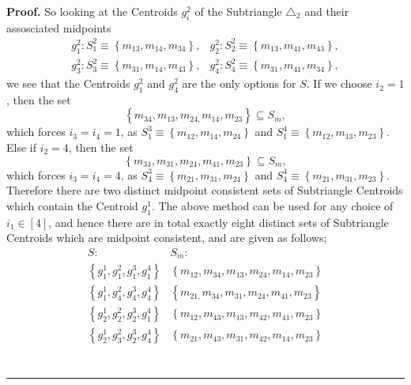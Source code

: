\documentclass{unswthesis}
\newenvironment{proof}[1][Proof]{\noindent\textbf{#1.} }{\ \rule{0.5em}{0.5em}}
\begin{document}
\begin{proof}
So looking at the Centroids $g_{i}^{2}$ of the Subtriangle $\triangle _{2}$
and their assosciated midpoints%
\begin{equation*}
\begin{array}{cc}
g_{1}^{2}:S_{1}^{2}\equiv \left\{ m_{13},m_{14},m_{34}\right\} , & 
g_{2}^{2}:S_{2}^{2}\equiv \left\{ m_{13},m_{41},m_{43}\right\} , \\ 
g_{3}^{2}:S_{3}^{2}\equiv \left\{ m_{31},m_{14},m_{43}\right\} , & 
g_{4}^{2}:S_{4}^{2}\equiv \left\{ m_{31},m_{41},m_{34}\right\} ,%
\end{array}%
\end{equation*}%
we see that the Centroids $g_{1}^{2}$ and $g_{4}^{2}$ are the only options
for $S$. If we choose $i_{2}=1$, then the set 
\begin{equation*}
\left\{ m_{34},m_{13},m_{24,}m_{14},m_{23}\right\} \subseteq S_{m}, 
\end{equation*}%
which forces $i_{3}=i_{4}=1$, as $S_{1}^{3}\equiv \left\{
m_{12},m_{14},m_{24}\right\} $ and $S_{1}^{4}\equiv \left\{
m_{12},m_{13},m_{23}\right\} $. Else if $i_{2}=4$, then the set 
\begin{equation*}
\left\{ m_{34},m_{31},m_{24},m_{41},m_{23}\right\} \subseteq S_{m}, 
\end{equation*}%
which forces $i_{3}=i_{4}=4$, as $S_{4}^{3}\equiv \left\{
m_{21},m_{31},m_{24}\right\} $ and $S_{4}^{4}\equiv \left\{
m_{21},m_{31},m_{23}\right\} $. Therefore there are two distinct midpoint
consistent sets of Subtriangle Centroids which contain the Centroid $%
g_{1}^{1}$. The above method can be used for any choice of $i_{1}\in \left[ 4%
\right] $, and hence there are in total exactly eight distinct sets of
Subtriangle Centroids which are midpoint consistent, and are given as
follows;%
\begin{equation*}
\begin{array}{cc}
S: & S_{m}: \\ 
\left\{ g_{1}^{1},g_{1}^{2},g_{1}^{3},g_{1}^{4}\right\} & \left\{
m_{12},m_{34},m_{13},m_{24},m_{14},m_{23}\right\} \\ 
\left\{ g_{1}^{1},g_{4}^{2},g_{4}^{3},g_{4}^{4}\right\} & \left\{
m_{21,}m_{34},m_{31},m_{24},m_{41},m_{23}\right\} \\ 
\left\{ g_{2}^{1},g_{2}^{2},g_{2}^{3},g_{1}^{4}\right\} & \left\{
m_{12},m_{43},m_{13},m_{42},m_{41},m_{23}\right\} \\ 
\left\{ g_{2}^{1},g_{3}^{2},g_{2}^{3},g_{4}^{4}\right\} & \left\{
m_{21},m_{43},m_{31},m_{42},m_{14},m_{23}\right\} \\ 

\end{array}
\end{equation*}
\end{proof}
\end{document}
